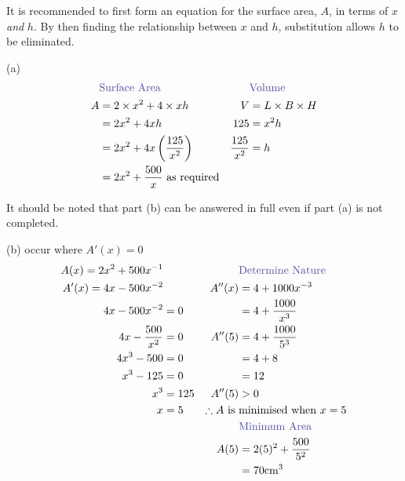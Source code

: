 \documentclass[
  11pt,
  openany]{book}
\begin{document}
It is recommended to first form an equation for the surface area, \(A\), in terms of \(x\) \textit{and} \(h\). By then finding the relationship between \(x\) and \(h\), substitution allows \(h\) to be eliminated.

\begin{tcolorbox}[colback=blue!1, colframe=blue!70!black!70!]

(a) 
\vspace{-0.9cm}
\begin{align*}
    &\textcolor{blue!70!black!70!}{\text{Surface Area}}&&\textcolor{blue!70!black!70!}{\text{Volume}}\\
    A&=2\times x^2+4\times xh& V&=L\times B\times H\\
    &=2x^2+4xh& 125&=x^2h\\
    &=2x^2+4x\left(\frac{125}{x^2}\right)&\frac{125}{x^2}&=h\\
    &=2x^2+\frac{500}{x}\text{ as required}
\end{align*}

\end{tcolorbox}

It should be noted that part (b) can be answered in full even if part (a) is not completed.

\begin{tcolorbox}[colback=blue!1, colframe=blue!70!black!70!]

(b) 
\textcolor{blue!70!black!70!}{} occur where $A'(x)=0$
\vspace{-0.1cm}
\begin{align*}
    A(x)=2x^2+500x^{-1}&&&\textcolor{blue!70!black!70!}{\text{Determine Nature}}\\
    A'(x)=4x-500x^{-2}&&A''(x)&=4+1000x^{-3}\\
    4x-500x^{-2}&=0&&=4+\frac{1000}{x^3}\\
    4x-\frac{500}{x^2}&=0&A''(5)&=4+\frac{1000}{5^3}\\
    4x^3-500&=0&&=4+8\\
    x^3-125&=0&&=12\\
    x^3&=125&A''(5)&>0\\
    x&=5&\therefore A\text{ is }&\text{minimised when }x=5\\
    &&&\textcolor{blue!70!black!70!}{\text{Minimum Area}}\\
    &&A(5)&=2(5)^2+\frac{500}{5^2}\\
    &&&=70\text{cm}^3
\end{align*}

\end{tcolorbox}
\end{document}

